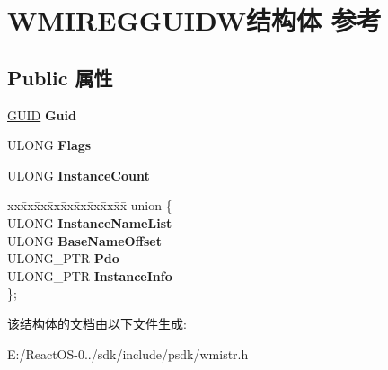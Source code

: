 \hypertarget{struct_w_m_i_r_e_g_g_u_i_d_w}{}\section{W\+M\+I\+R\+E\+G\+G\+U\+I\+D\+W结构体 参考}
\label{struct_w_m_i_r_e_g_g_u_i_d_w}
\subsection*{Public 属性}
\begin{DoxyCompactItemize}
\item 
\mbox{\label{struct_w_m_i_r_e_g_g_u_i_d_w_a39e63055056ef2924402d11ac3b72d41}} 
\hyperlink{interface_g_u_i_d}{G\+U\+ID} {\bfseries Guid}
\item 
\mbox{\label{struct_w_m_i_r_e_g_g_u_i_d_w_a15c4923adfbd9a8191d2f22cdcada52a}} 
U\+L\+O\+NG {\bfseries Flags}
\item 
\mbox{\label{struct_w_m_i_r_e_g_g_u_i_d_w_a62c230da613b2e2a704189aad759294c}} 
U\+L\+O\+NG {\bfseries Instance\+Count}
\item 
\mbox{\label{struct_w_m_i_r_e_g_g_u_i_d_w_a2c3b92392ff9c6594306b4c1de2bb17e}} 
\begin{tabbing}
xx\=xx\=xx\=xx\=xx\=xx\=xx\=xx\=xx\=\kill
union \{\\
\>ULONG {\bfseries InstanceNameList}\\
\>ULONG {\bfseries BaseNameOffset}\\
\>ULONG\_PTR {\bfseries Pdo}\\
\>ULONG\_PTR {\bfseries InstanceInfo}\\
\}; \\

\end{tabbing}\end{DoxyCompactItemize}


该结构体的文档由以下文件生成\+:\begin{DoxyCompactItemize}
\item 
E\+:/\+React\+O\+S-\/0../sdk/include/psdk/wmistr.\+h\end{DoxyCompactItemize}
